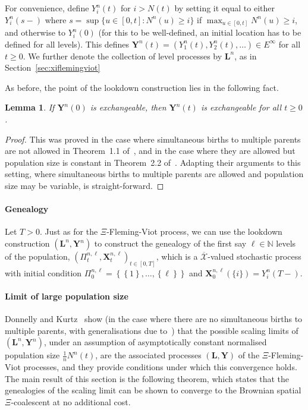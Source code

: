 \documentclass[reqno,draft]{amsart}
\numberwithin{equation}{section}
\theoremstyle{plain}
\newtheorem{lemma}[theorem]{Lemma}
\theoremstyle{remark}
\newcommand{\N}{\mathbb{N}} %
\newcommand{\fpart}{\Pi} %
\begin{document}
For convenience, define $Y^n_i(t)$ for $i > N(t)$ by setting it equal to either $Y^n_i(s-)$ where $s = \sup \{u \in [0,t]\colon N^n(u) \ge i\}$ if $\max_{u\in [0,t]} N^n(u) \ge i$, and otherwise to $Y^n_i(0)$ (for this to be well-defined, an initial location has to be defined for all levels). This defines $\boldsymbol Y^n(t) = (Y^n_1(t),Y^n_2(t),\ldots) \in E^\infty$ for all $t \ge 0$. We further denote the collection of level processes by $\boldsymbol L^n$, as in Section~\ref{sec:xiflemingviot}

As before, the point of the lookdown construction lies in the following fact.
\begin{lemma}
    If $\boldsymbol Y^n(0)$ is exchangeable, then $\boldsymbol Y^n(t)$ is exchangeable for all $t \ge 0$.
\end{lemma}
\begin{proof}
    This was proved in the case where simultaneous births to multiple parents are not allowed in Theorem~1.1 of~\cite{DK99}, and in the case where they are allowed but population size is constant in Theorem~2.2 of~\cite{xiflemingviot}. Adapting their arguments to this setting, where simultaneous births to multiple parents are allowed and population size may be variable, is straight-forward.
\end{proof}

\medskip\paragraph{\textbf{Genealogy}}
Let $T > 0$. Just as for the $\Xi$-Fleming-Viot process, we can use the lookdown construction $(\boldsymbol L^n,\boldsymbol Y^n)$ to construct the genealogy of the first say $\ell\in \N$ levels of the population, $(\fpart_t^{n,\ell},\boldsymbol X_t^{n,\ell})_{t\in [0,T]}$, which is a $\overline{\mathcal{X}}$-valued stochastic process with initial condition $\fpart_0^{n,\ell} = \left\{ \left\{ 1 \right\} , \ldots ,\left\{ \ell \right\}  \right\} $ and $\boldsymbol X_0^{n,\ell}(\{i\}) = Y^n_i(T-)$.

\medskip\paragraph{\textbf{Limit of large population size}}
Donnelly and Kurtz~\cite{DK99} show (in the case where there are no simultaneous births to multiple parents, with generalisations due to~\cite{xiflemingviot}) that the possible scaling limits of $(\boldsymbol L^n,\boldsymbol Y^n)$, under an assumption of asymptotically constant normalised population size $\frac{1}{n} N^n(t)$, are the associated processes $(\boldsymbol L,\boldsymbol Y)$ of the $\Xi$-Fleming-Viot processes, and they provide conditions under which this convergence holds. The main result of this section is the following theorem, which states that the genealogies of the scaling limit can be shown to converge to the Brownian spatial $\Xi$-coalescent at no additional cost.
\end{document}
